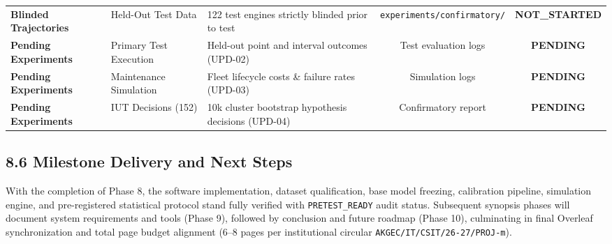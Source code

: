 \documentclass[12pt,a4paper]{article}
\begin{document}
\begin{table}[htbp]
\begin{tabularx}{\textwidth}{llXcc}
\midrule
\textbf{Blinded Trajectories} & Held-Out Test Data & 122 test engines strictly blinded prior to test & \texttt{experiments/confirmatory/} & \textbf{NOT\_STARTED} \\
\textbf{Pending Experiments} & Primary Test Execution & Held-out point and interval outcomes (UPD-02) & Test evaluation logs & \textbf{PENDING} \\
\textbf{Pending Experiments} & Maintenance Simulation & Fleet lifecycle costs \& failure rates (UPD-03) & Simulation logs & \textbf{PENDING} \\
\textbf{Pending Experiments} & IUT Decisions (152) & 10k cluster bootstrap hypothesis decisions (UPD-04) & Confirmatory report & \textbf{PENDING} \\
\bottomrule
\end{tabularx}
\end{table}

\subsection*{8.6 Milestone Delivery and Next Steps}
With the completion of Phase 8, the software implementation, dataset qualification, base model freezing, calibration pipeline, simulation engine, and pre-registered statistical protocol stand fully verified with \texttt{PRETEST\_READY} audit status. Subsequent synopsis phases will document system requirements and tools (Phase 9), followed by conclusion and future roadmap (Phase 10), culminating in final Overleaf synchronization and total page budget alignment (6--8 pages per institutional circular \texttt{AKGEC/IT/CSIT/26-27/PROJ-m}).
\end{document}
